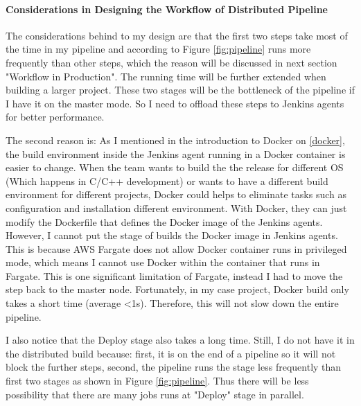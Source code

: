 \paragraph[]{Considerations in Designing the Workflow of Distributed Pipeline}
The considerations behind to my design are that the first two steps take most of the time in my pipeline and according to Figure \ref{fig:pipeline} runs more frequently than other steps, which the reason will be discussed in next section "Workflow in Production". The running time will be further extended when building a larger project. These two stages will be the bottleneck of the pipeline if I have it on the master mode. So I need to offload these steps to Jenkins agents for better performance.
\par
The second reason is: As I mentioned in the introduction to Docker on \ref {docker}, the build environment inside the Jenkins agent running in a Docker container is easier to change.
When the team wants to build the the release for different OS (Which happens in C/C++ development) or wants to have a different build environment for different projects, Docker could helps to eliminate tasks such as configuration and installation different environment. With Docker, they can just modify the Dockerfile that defines the Docker image of the Jenkins agents. 
However, I cannot put the stage of builds the Docker image in Jenkins agents. This is because AWS Fargate does not allow Docker container runs in privileged mode, which means I cannot use Docker within the container that runs in Fargate. This is one significant limitation of Fargate, instead I had to move the step back to the master node. Fortunately, in my case project, Docker build only takes a short time (average <1s). Therefore, this will not slow down the entire pipeline.
\par
I also notice that the Deploy stage also takes a long time. Still, I do not have it in the distributed build because: first, it is on the end of a pipeline so it will not block the further steps, second, the pipeline runs the stage less frequently than first two stages as shown in Figure \ref{fig:pipeline}. Thus there will be less possibility that there are many jobs runs at "Deploy" stage in parallel.
